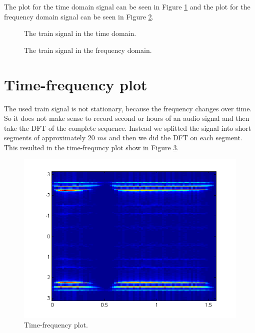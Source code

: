 \documentclass[final]{scrreprt} %
\begin{document}
The plot for the time domain signal can be seen in Figure \ref{fig:timedomain} and the plot for the frequency domain signal can be seen in Figure \ref{fig:freqdomain}.


\begin{figure}[H]
	\centering
	\setlength\figureheight{6cm}
    	\setlength\figurewidth{10cm}
	
	\caption{The train signal in the time domain.}
	\label{fig:timedomain}
\end{figure}



\begin{figure}[H]
	\centering
	\setlength\figureheight{6cm}
  	\setlength\figurewidth{10cm}
	
	\caption{The train signal in the frequency domain.}
	\label{fig:freqdomain}
\end{figure}

\section{Time-frequency plot}
The used train signal is not stationary, because the frequency changes over time. 
So it does not make sense to record second or hours of an audio signal and then take the DFT of the complete sequence. 
Instead we splitted the signal into short segments of approximately 20 $ms$ and then we did the DFT on each segment. 
This resulted in the time-frequncy plot show in Figure \ref{fig:timefreq}.

\begin{figure}[h]
\centering
\includegraphics[scale = 0.5]{resources/labday1/timefrequentieplot.png}
\caption{Time-frequency plot.}
\label{fig:timefreq}
\end{figure}
\end{document}
